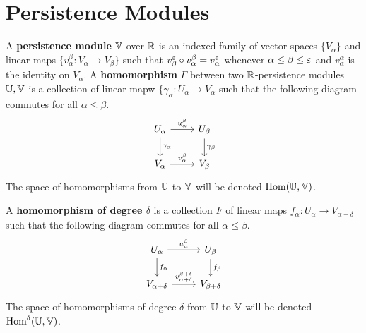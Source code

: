 
\section{Persistence Modules}

A \textbf{persistence module} $\mathbb{V}$ over $\mathbb{R}$ is an indexed family of vector spaces $\{V_\alpha\}$ and linear maps $\{v_\alpha^\beta : V_\alpha\to V_\beta\}$ such that $v^\varepsilon_\beta\circ v_\alpha^\beta = v_\alpha^\varepsilon$ whenever $\alpha\leq\beta\leq\varepsilon$ and $v_\alpha^\alpha$ is the identity on $V_\alpha$.
A \textbf{homomorphism} $\Gamma$ between two $\mathbb{R}$-persistence modules $\mathbb{U}, \mathbb{V}$ is a collection of linear mapw $\{\gamma_\alpha : U_\alpha\to V_\alpha$ such that the following diagram commutes for all $\alpha\leq\beta$.
\begin{equation}\label{dgm:homomorphism}
  \begin{tikzcd}
    U_\alpha\arrow{r}{u_\alpha^\beta}\arrow{d}{\gamma_\alpha} &
    U_\beta\arrow{d}{\gamma_\beta}\\
    V_\alpha\arrow{r}{v_\alpha^\beta} &
    V_\beta
\end{tikzcd}\end{equation}
The space of homomorphisms from $\mathbb{U}$ to $\mathbb{V}$ will be denoted $\text{Hom}(\mathbb{U}, \mathbb{V})$.

A \textbf{homomorphism of degree $\delta$} is a collection $F$ of linear maps $f_\alpha : U_\alpha\to V_{\alpha+\delta}$ such that the following diagram commutes for all $\alpha\leq\beta$.
\begin{equation}\label{dgm:shifted_homomorphism}
  \begin{tikzcd}
    U_\alpha\arrow{r}{u_\alpha^\beta}\arrow{d}{f_\alpha} &
    U_\beta\arrow{d}{f_\beta}\\
    V_{\alpha+\delta}\arrow{r}{v_{\alpha+\delta}^{\beta+\delta}} &
    V_{\beta +\delta}
\end{tikzcd}\end{equation}
The space of homomorphisms of degree $\delta$ from $\mathbb{U}$ to $\mathbb{V}$ will be denoted $\text{Hom}^\delta(\mathbb{U}, \mathbb{V})$.

